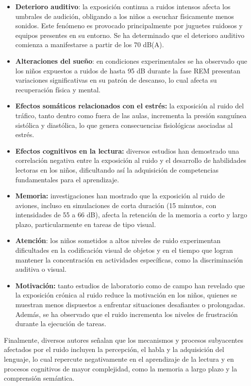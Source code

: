 {{\begin{itemize}
    \item \textbf{Deterioro auditivo}: la exposición continua a ruidos intensos afecta los umbrales de audición, obligando a los niños a escuchar físicamente menos sonidos. Este fenómeno es provocado principalmente por juguetes ruidosos y equipos presentes en su entorno. Se ha determinado que el deterioro auditivo comienza a manifestarse a partir de los 70 dB(A).
    \item \textbf{Alteraciones del sueño}: en condiciones experimentales se ha observado que los niños expuestos a ruidos de hasta 95 dB durante la fase REM presentan variaciones significativas en su patrón de descanso, lo cual afecta su recuperación física y mental.
    \item \textbf{Efectos somáticos relacionados con el estrés:} la exposición al ruido del tráfico, tanto dentro como fuera de las aulas, incrementa la presión sanguínea sistólica y diastólica, lo que genera consecuencias fisiológicas asociadas al estrés.
    \item \textbf{Efectos cognitivos en la lectura:} diversos estudios han demostrado una correlación negativa entre la exposición al ruido y el desarrollo de habilidades lectoras en los niños, dificultando así la adquisición de competencias fundamentales para el aprendizaje.
    \item \textbf{Memoria:} investigaciones han mostrado que la exposición al ruido de aviones, incluso en simulaciones de corta duración (15 minutos, con intensidades de 55 a 66 dB), afecta la retención de la memoria a corto y largo plazo, particularmente en tareas de tipo visual.
    \item \textbf{Atención}: los niños sometidos a altos niveles de ruido experimentan dificultades en la codificación visual de objetos y en el tiempo que logran mantener la concentración en actividades específicas, como la discriminación auditiva o visual.
    \item \textbf{Motivación:} tanto estudios de laboratorio como de campo han revelado que la exposición crónica al ruido reduce la motivación en los niños, quienes se muestran menos dispuestos a enfrentar situaciones desafiantes o prolongadas. Además, se ha observado que el ruido incrementa los niveles de frustración durante la ejecución de tareas.
\end{itemize}

Finalmente, diversos autores señalan que los mecanismos y procesos subyacentes afectados por el ruido incluyen la percepción, el habla y la adquisición del lenguaje, lo cual repercute negativamente en el aprendizaje de la lectura y en procesos cognitivos de mayor complejidad, como la memoria a largo plazo y la comprensión semántica.

}}
